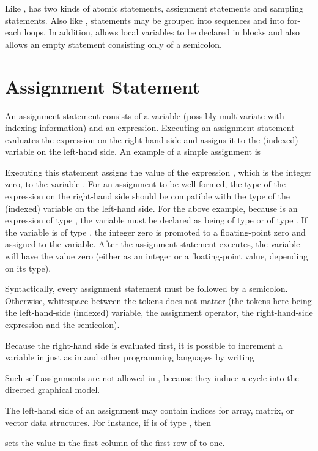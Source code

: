 Like \BUGS, \Stan has two kinds of atomic statements, assignment
statements and sampling statements.  Also like \BUGS, statements may
be grouped into sequences and into for-each loops.  In addition, \Stan
allows local variables to be declared in blocks and also allows an
empty statement consisting only of a semicolon.

\section{Assignment Statement}

An assignment statement consists of a variable (possibly multivariate
with indexing information) and an expression.  Executing an
assignment statement evaluates the expression on the right-hand side
and assigns it to the (indexed) variable on the left-hand side.  An
example of a simple assignment is
%
\begin{quote}
\end{quote}
%
Executing this statement assigns the value of the expression ,
which is the integer zero, to the variable .  For an assignment
to be well formed, the type of the expression on the right-hand side
should be compatible with the type of the (indexed) variable on the
left-hand side.  For the above example, because  is an
expression of type , the variable  must be declared
as being of type  or of type .  If the variable
is of type , the integer zero is promoted to a
floating-point zero and assigned to the variable.  After the
assignment statement executes, the variable  will have the
value zero (either as an integer or a floating-point value, depending on
its type).

Syntactically, every assignment statement must be followed by a
semicolon.  Otherwise, whitespace between the tokens does not matter
(the tokens here being the left-hand-side (indexed) variable, the
assignment operator, the right-hand-side expression and the
semicolon).

Because the right-hand side is evaluated first, it is possible to
increment a variable in \Stan just as in \Cpp and other programming
languages by writing
%
\begin{quote}
\end{quote}
%
Such self assignments are not allowed in \BUGS, because they induce a
cycle into the directed graphical model.

The left-hand side of an assignment may contain indices for array, matrix, or vector
data structures.  For instance, if  is of type
, then 
%
\begin{quote}
\end{quote}
%
sets the value in the first column of the first row of  to one.

